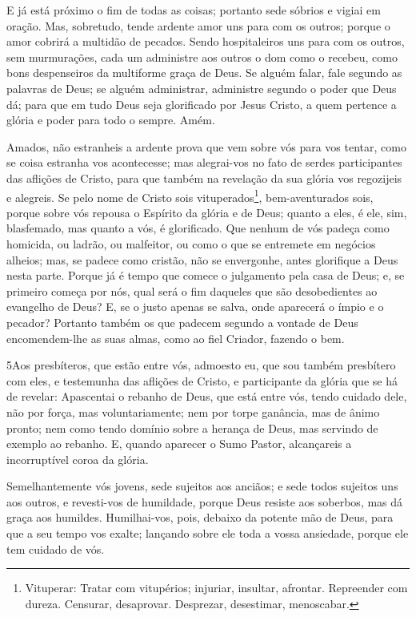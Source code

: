 E já está próximo o fim de todas as coisas; portanto sede sóbrios
e vigiai em oração. Mas, sobretudo, tende ardente amor uns para
com os outros; porque o amor cobrirá a multidão de pecados.
Sendo hospitaleiros uns para com os outros, sem murmurações,
cada um administre aos outros o dom como o recebeu, como bons
despenseiros da multiforme graça de Deus. Se alguém falar,
fale segundo as palavras de Deus; se alguém administrar, administre
segundo o poder que Deus dá; para que em tudo Deus seja glorificado
por Jesus Cristo, a quem pertence a glória e poder para todo o
sempre. Amém.

Amados, não estranheis a ardente prova que vem sobre vós para vos
tentar, como se coisa estranha vos acontecesse; mas
alegrai-vos no fato de serdes participantes das aflições de Cristo,
para que também na revelação da sua glória vos regozijeis e
alegreis. Se pelo nome de Cristo sois
vituperados\footnote{Vituperar: Tratar com vitupérios; injuriar,
insultar, afrontar. Repreender com dureza. Censurar, desaprovar.
Desprezar, desestimar, menoscabar.}, bem-aventurados sois, porque
sobre vós repousa o Espírito da glória e de Deus; quanto a eles, é
ele, sim, blasfemado, mas quanto a vós, é glorificado. Que
nenhum de vós padeça como homicida, ou ladrão, ou malfeitor, ou como
o que se entremete em negócios alheios; mas, se padece como
cristão, não se envergonhe, antes glorifique a Deus nesta parte.
Porque já é tempo que comece o julgamento pela casa de Deus;
e, se primeiro começa por nós, qual será o fim daqueles que são
desobedientes ao evangelho de Deus? E, se o justo apenas se
salva, onde aparecerá o ímpio e o pecador? Portanto também os
que padecem segundo a vontade de Deus encomendem-lhe as suas almas,
como ao fiel Criador, fazendo o bem.

\medskip

\lettrine{5} Aos presbíteros, que estão entre vós, admoesto
eu, que sou também presbítero com eles, e testemunha das aflições de
Cristo, e participante da glória que se há de revelar:
Apascentai o rebanho de Deus, que está entre vós, tendo cuidado
dele, não por força, mas voluntariamente; nem por torpe ganância,
mas de ânimo pronto; nem como tendo domínio sobre a herança de
Deus, mas servindo de exemplo ao rebanho. E, quando aparecer o
Sumo Pastor, alcançareis a incorruptível coroa da glória.

Semelhantemente vós jovens, sede sujeitos aos anciãos; e sede
todos sujeitos uns aos outros, e revesti-vos de humildade, porque
Deus resiste aos soberbos, mas dá graça aos humildes.
Humilhai-vos, pois, debaixo da potente mão de Deus, para que a
seu tempo vos exalte; lançando sobre ele toda a vossa ansiedade,
porque ele tem cuidado de vós.

